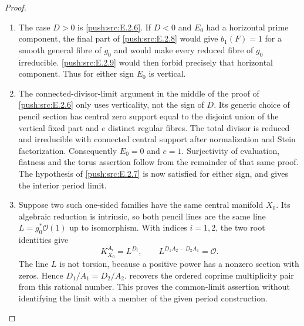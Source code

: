\begin{proof}

\begin{enumerate}[label={$\langle1\rangle$\arabic*.},leftmargin=*]
\item The case $D>0$ is \ref{push:src:E.2.6}.  If $D<0$ and $E_0$ had a
horizontal prime component, the final part of \ref{push:src:E.2.8} would
give $b_1(F)=1$ for a smooth general fibre of $g_0$ and
would make every reduced fibre of $g_0$ irreducible.
\ref{push:src:E.2.9} would then forbid precisely that horizontal component.
Thus for either sign $E_0$ is vertical.

\item The connected-divisor-limit argument in the middle of the
proof of \ref{push:src:E.2.6} only uses verticality, not the sign of $D$.
Its generic choice of pencil section has central zero
support equal to the disjoint union of the vertical fixed
part and $e$ distinct regular fibres.  The total divisor
is reduced and irreducible with connected central support
after normalization and Stein factorization.  Consequently
$E_0=0$ and $e=1$.  Surjectivity of evaluation, flatness and
the torus assertion follow from the remainder of that same
proof.  The hypothesis of \ref{push:src:E.2.7} is now satisfied for either
sign, and gives the interior period limit.

\item Suppose two such one-sided families have the same central
manifold $X_0$.  Its algebraic reduction is intrinsic, so
both pencil lines are the same line
$L=g_0^*\mathcal O(1)$ up to isomorphism.  With indices
$i=1,2$, the two root identities give
\[
 K_{X_0}^{A_i}=L^{D_i},\qquad
 L^{D_1A_2-D_2A_1}=\mathcal O.
\]
The line $L$ is not torsion, because a positive power has
a nonzero section with zeros.  Hence $D_1/A_1=D_2/A_2$.
 recovers the ordered coprime multiplicity pair from
this rational number.  This proves the common-limit
assertion without identifying the limit with a member of
the given period construction.

\end{enumerate}
\end{proof}
